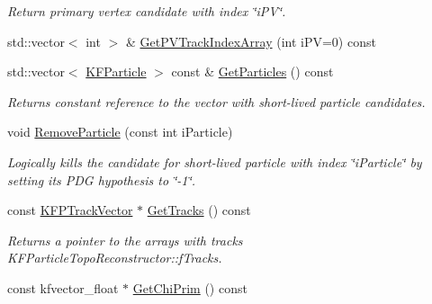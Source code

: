 \begin{DoxyCompactItemize}
\begin{DoxyCompactList}\small\item\em Return primary vertex candidate with index \char`\"{}i\+P\+V\char`\"{}. \end{DoxyCompactList}\item 
std\+::vector$<$ int $>$ \& \hyperlink{classKFParticleTopoReconstructor_a266245beee4e8992d8056fae20fb4614}{Get\+P\+V\+Track\+Index\+Array} (int i\+PV=0) const 
\item 
std\+::vector$<$ \hyperlink{classKFParticle}{K\+F\+Particle} $>$ const \& \hyperlink{classKFParticleTopoReconstructor_a0d4bb4c733848884708c59f9e5b3f054}{Get\+Particles} () const \hypertarget{classKFParticleTopoReconstructor_a0d4bb4c733848884708c59f9e5b3f054}{}\label{classKFParticleTopoReconstructor_a0d4bb4c733848884708c59f9e5b3f054}

\begin{DoxyCompactList}\small\item\em Returns constant reference to the vector with short-\/lived particle candidates. \end{DoxyCompactList}\item 
void \hyperlink{classKFParticleTopoReconstructor_ade1dd3c36a9ff0c4b1ae350eac0d879c}{Remove\+Particle} (const int i\+Particle)\hypertarget{classKFParticleTopoReconstructor_ade1dd3c36a9ff0c4b1ae350eac0d879c}{}\label{classKFParticleTopoReconstructor_ade1dd3c36a9ff0c4b1ae350eac0d879c}

\begin{DoxyCompactList}\small\item\em Logically kills the candidate for short-\/lived particle with index \char`\"{}i\+Particle\char`\"{} by setting its P\+DG hypothesis to \char`\"{}-\/1\char`\"{}. \end{DoxyCompactList}\item 
const \hyperlink{classKFPTrackVector}{K\+F\+P\+Track\+Vector} $\ast$ \hyperlink{classKFParticleTopoReconstructor_a6d19ea0325148dbe0ee017cfce7bbbc8}{Get\+Tracks} () const \hypertarget{classKFParticleTopoReconstructor_a6d19ea0325148dbe0ee017cfce7bbbc8}{}\label{classKFParticleTopoReconstructor_a6d19ea0325148dbe0ee017cfce7bbbc8}

\begin{DoxyCompactList}\small\item\em Returns a pointer to the arrays with tracks K\+F\+Particle\+Topo\+Reconstructor\+::f\+Tracks. \end{DoxyCompactList}\item 
const kfvector\+\_\+float $\ast$ \hyperlink{classKFParticleTopoReconstructor_a1de8549a6166635697e4f9f9e2c3dac8}{Get\+Chi\+Prim} () const \hypertarget{classKFParticleTopoReconstructor_a1de8549a6166635697e4f9f9e2c3dac8}{}\label{classKFParticleTopoReconstructor_a1de8549a6166635697e4f9f9e2c3dac8}


\end{DoxyCompactItemize}
